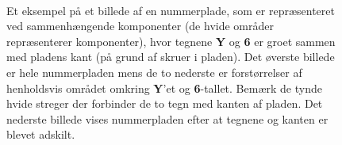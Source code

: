 \begin{figure}[htp]
  \centering
  \begin{minipage}[c]{8 cm}
	\end{minipage}\\
  \begin{minipage}[c]{8 cm}
	\end{minipage}
	\begin{minipage}[c]{8 cm}
	\end{minipage}
	\caption{Et eksempel på et billede af en nummerplade, som er repræsenteret ved sammenhængende komponenter (de hvide områder repræsenterer komponenter), hvor tegnene \textbf{Y} og \textbf{6} er groet sammen med pladens kant (på grund af skruer i pladen). Det øverste billede er hele nummerpladen mens de to nederste er forstørrelser af henholdsvis området omkring \textbf{Y}'et og \textbf{6}-tallet. Bemærk de tynde hvide streger der forbinder de to tegn med kanten af pladen. Det nederste billede vises nummerpladen efter at tegnene og kanten er blevet adskilt.}
  \label{fig:skygge}
\end{figure}

